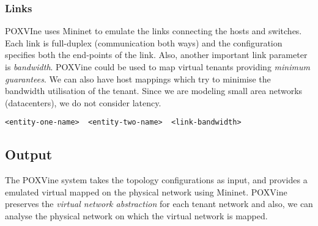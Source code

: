 \subsubsection{Links}
POXVIne uses Mininet to emulate the links connecting the hosts and switches. Each link is full-duplex (communication both ways) and the configuration specifies both the end-points of the link. Also, another important link parameter is \emph{bandwidth}. POXVine could be used to map virtual tenants providing \emph{minimum guarantees}. We can also have host mappings which try to minimise the bandwidth utilisation of the tenant. Since we are modeling small area networks (datacenters), we do not consider latency.
\begin{verbatim}
<entity-one-name>  <entity-two-name>  <link-bandwidth>  
\end{verbatim}

\subsection{Output}
The POXVine system takes the topology configurations as input, and provides a emulated virtual mapped on the physical network using Mininet. POXVine preserves the \emph{virtual network abstraction} for each tenant network and also, we can analyse the physical network on which the virtual network is mapped.


